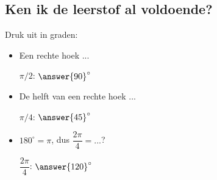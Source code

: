 \documentclass{ximera}
\begin{document}
\subsection{Ken ik de leerstof al voldoende?}
\begin{expandable}
		  Druk uit in graden:
		  \begin{itemize}
	              \item 
			\begin{problem}
				\begin{hint} Een rechte hoek ... \end{hint}
				$\pi/2$: $\answer{90}^\circ$
			\end{problem}
	              \item 
			\begin{problem}
				\begin{hint} De helft van een rechte hoek ... \end{hint}
				$\pi/4$: $\answer{45}^\circ$
			\end{problem}
		      \item 
			\begin{problem}
				\begin{hint} $180^\circ = \pi$, dus $\dfrac{2\pi}{4} = ...$?\end{hint}
				$\dfrac{2\pi}{4}$: $\answer{120}^\circ$
			\end{problem}
		  \end{itemize}
\end{expandable}
\end{document}
